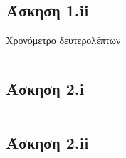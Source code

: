 \documentclass[a4paper,10pt]{article} \usepackage{anysize}
\begin{document}


\section*{} \setcounter{section}{1}
\subsection*{Άσκηση 1.ii}\setcounter{subsection}{1}
Χρονόμετρο δευτερολέπτων

\inputminted[linenos,fontsize=\footnotesize]{oldasm}{../askhsh_1_ii.8085}
\subsection*{Άσκηση 2.i}
\inputminted[linenos,fontsize=\footnotesize]{oldasm}{../askhsh_2_i.8085}
\subsection*{Άσκηση 2.ii}
\inputminted[linenos,fontsize=\footnotesize]{oldasm}{../askhsh_2_ii.8085}
\end{document}
